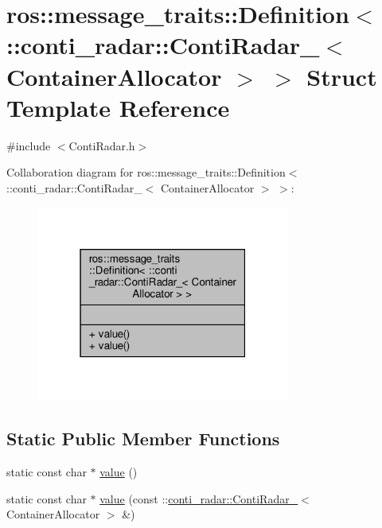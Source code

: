 \hypertarget{structros_1_1message__traits_1_1Definition_3_01_1_1conti__radar_1_1ContiRadar___3_01ContainerAllocator_01_4_01_4}{}\section{ros\+:\+:message\+\_\+traits\+:\+:Definition$<$ \+:\+:conti\+\_\+radar\+:\+:Conti\+Radar\+\_\+$<$ Container\+Allocator $>$ $>$ Struct Template Reference}
\label{structros_1_1message__traits_1_1Definition_3_01_1_1conti__radar_1_1ContiRadar___3_01ContainerAllocator_01_4_01_4}


{\ttfamily \#include $<$Conti\+Radar.\+h$>$}



Collaboration diagram for ros\+:\+:message\+\_\+traits\+:\+:Definition$<$ \+:\+:conti\+\_\+radar\+:\+:Conti\+Radar\+\_\+$<$ Container\+Allocator $>$ $>$\+:\nopagebreak
\begin{figure}[H]
\begin{center}
\leavevmode
\includegraphics[width=235pt]{d7/dda/structros_1_1message__traits_1_1Definition_3_01_1_1conti__radar_1_1ContiRadar___3_01ContainerAllocator_01_4_01_4__coll__graph}
\end{center}
\end{figure}
\subsection*{Static Public Member Functions}
\begin{DoxyCompactItemize}
\item 
static const char $\ast$ \hyperlink{structros_1_1message__traits_1_1Definition_3_01_1_1conti__radar_1_1ContiRadar___3_01ContainerAllocator_01_4_01_4_a9eb5385c3c85f1433113be2868acbd9d}{value} ()
\item 
static const char $\ast$ \hyperlink{structros_1_1message__traits_1_1Definition_3_01_1_1conti__radar_1_1ContiRadar___3_01ContainerAllocator_01_4_01_4_a9e81997e49669bf95970ac06ede5d454}{value} (const \+::\hyperlink{structconti__radar_1_1ContiRadar__}{conti\+\_\+radar\+::\+Conti\+Radar\+\_\+}$<$ Container\+Allocator $>$ \&)
\end{DoxyCompactItemize}


